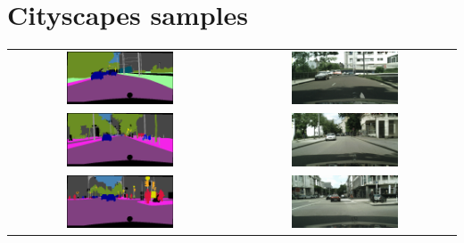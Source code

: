 \section{Cityscapes samples}


\begin{longtable}{cc} \label{tab:a1}
    \includegraphics[width=0.50\textwidth]{Chapters/figures/appendix/cityscapes/frankfurt_000000_006589_leftImg8bit_mask.png} & \includegraphics[width=0.50\textwidth]{Chapters/figures/appendix/cityscapes/frankfurt_000000_006589_leftImg8bit_sample.png} \\
    \includegraphics[width=0.50\textwidth]{Chapters/figures/appendix/cityscapes/frankfurt_000000_015389_leftImg8bit_mask.png} & \includegraphics[width=0.50\textwidth]{Chapters/figures/appendix/cityscapes/frankfurt_000000_015389_leftImg8bit_sample.png} \\
    \includegraphics[width=0.50\textwidth]{Chapters/figures/appendix/cityscapes/frankfurt_000000_019607_leftImg8bit_mask.png} & \includegraphics[width=0.50\textwidth]{Chapters/figures/appendix/cityscapes/frankfurt_000000_019607_leftImg8bit_sample.png} \\

\end{longtable}
